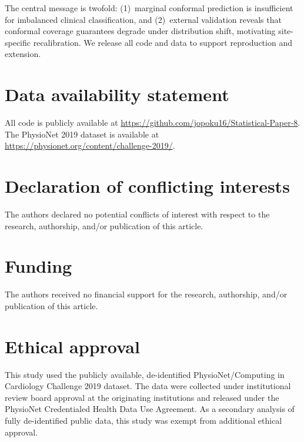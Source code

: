 \documentclass[12pt]{article}
\begin{document}
The central message is twofold: (1)~marginal conformal prediction
is insufficient for imbalanced clinical classification, and
(2)~external validation reveals that conformal coverage guarantees
degrade under distribution shift, motivating site-specific
recalibration.  We release all code and data to support
reproduction and extension.


\section*{Data availability statement}

All code is publicly available at
\url{https://github.com/jopoku16/Statistical-Paper-8}.
The PhysioNet 2019 dataset is available at
\url{https://physionet.org/content/challenge-2019/}.


\section*{Declaration of conflicting interests}

The authors declared no potential conflicts of interest with
respect to the research, authorship, and/or publication of this
article.


\section*{Funding}

The authors received no financial support for the research,
authorship, and/or publication of this article.


\section*{Ethical approval}

This study used the publicly available, de-identified
PhysioNet/Computing in Cardiology Challenge 2019
dataset.\cite{reyna2020early}  The data were collected under
institutional review board approval at the originating
institutions and released under the PhysioNet Credentialed Health
Data Use Agreement.  As a secondary analysis of fully
de-identified public data, this study was exempt from additional
ethical approval.
\end{document}
